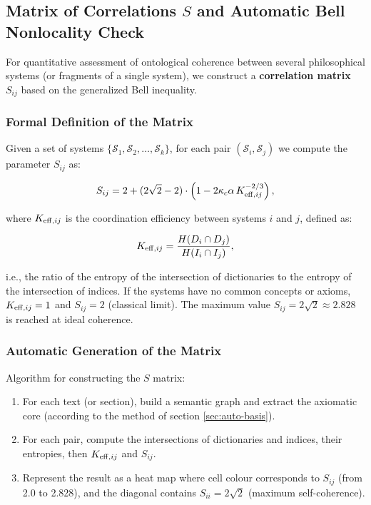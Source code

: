 \documentclass[12pt,a4paper]{article}
\newcommand{\kappac}{\kappa_c}
\begin{document}
	\subsection{Matrix of Correlations \(S\) and Automatic Bell Nonlocality Check}
	\label{subsec:bell-matrix}
	
	For quantitative assessment of ontological coherence between several philosophical systems (or fragments of a single system), we construct a \textbf{correlation matrix \(S_{ij}\)} based on the generalized Bell inequality.
	
	\subsubsection{Formal Definition of the Matrix}
	
	Given a set of systems \(\{\mathcal{S}_1, \mathcal{S}_2, \dots, \mathcal{S}_k\}\), for each pair \((\mathcal{S}_i, \mathcal{S}_j)\) we compute the parameter \(S_{ij}\) as:
	
	\[
	S_{ij} = 2 + (2\sqrt{2} - 2) \cdot \left(1 - 2\kappac \alpha \, \Keff[ij]^{-2/3}\right),
	\]
	
	where \(\Keff[ij]\) is the coordination efficiency between systems \(i\) and \(j\), defined as:
	
	\[
	\Keff[ij] = \frac{H(D_i \cap D_j)}{H(I_i \cap I_j)},
	\]
	
	i.e., the ratio of the entropy of the intersection of dictionaries to the entropy of the intersection of indices. If the systems have no common concepts or axioms, \(\Keff[ij] = 1\) and \(S_{ij} = 2\) (classical limit). The maximum value \(S_{ij} = 2\sqrt{2} \approx 2.828\) is reached at ideal coherence.
	
	\subsubsection{Automatic Generation of the Matrix}
	
	Algorithm for constructing the \(S\) matrix:
	
	\begin{enumerate}
		\item For each text (or section), build a semantic graph and extract the axiomatic core (according to the method of section \ref{sec:auto-basis}).
		\item For each pair, compute the intersections of dictionaries and indices, their entropies, then \(\Keff[ij]\) and \(S_{ij}\).
		\item Represent the result as a heat map where cell colour corresponds to \(S_{ij}\) (from 2.0 to 2.828), and the diagonal contains \(S_{ii} = 2\sqrt{2}\) (maximum self-coherence).
	\end{enumerate}
	
\end{document}
